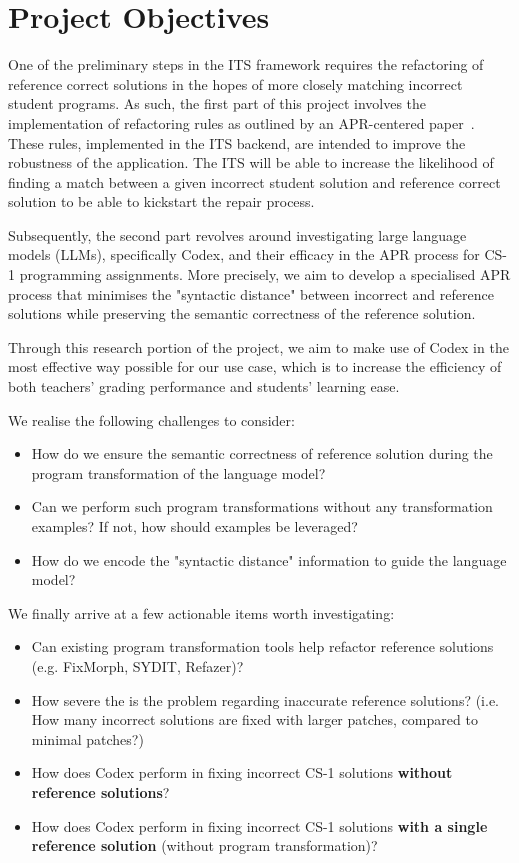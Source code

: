 \section{Project Objectives}

One of the preliminary steps in the ITS framework requires the refactoring of reference correct
solutions in the hopes of more closely matching incorrect student programs.
As such, the first part of this project involves the implementation of refactoring rules as
outlined by an APR-centered paper~\cite{hu2019re}.
These rules, implemented in the ITS backend, are intended to improve the robustness of the
application.
The ITS will be able to increase the likelihood of finding a match between a given incorrect
student solution and reference correct solution to be able to kickstart the repair process.

Subsequently, the second part revolves around investigating large language models (LLMs),
specifically Codex, and their efficacy in the APR process for CS-1 programming assignments.
More precisely, we aim to develop a specialised APR process that minimises the "syntactic
distance" between incorrect and reference solutions while preserving the semantic
correctness of the reference solution.

Through this research portion of the project, we aim to make use of Codex in the most
effective way possible for our use case, which is to increase the efficiency of both
teachers' grading performance and students' learning ease.

We realise the following challenges to consider:
\begin{itemize}
    \item How do we ensure the semantic correctness of reference solution during the program
          transformation of the language model?
    \item Can we perform such program transformations without any transformation examples?
          If not, how should examples be leveraged?
    \item How do we encode the "syntactic distance" information to guide the language model?
\end{itemize}

We finally arrive at a few actionable items worth investigating:
\begin{itemize}
    \item Can existing program transformation tools help refactor reference solutions
          (e.g. FixMorph, SYDIT, Refazer)?
    \item How severe the is the problem regarding inaccurate reference solutions?
          (i.e. How many incorrect solutions are fixed with larger patches, compared
           to minimal patches?)
    \item How does Codex perform in fixing incorrect CS-1 solutions \textbf{without reference solutions}?
    \item How does Codex perform in fixing incorrect CS-1 solutions \textbf{with a single reference
          solution} (without program transformation)?
\end{itemize}

